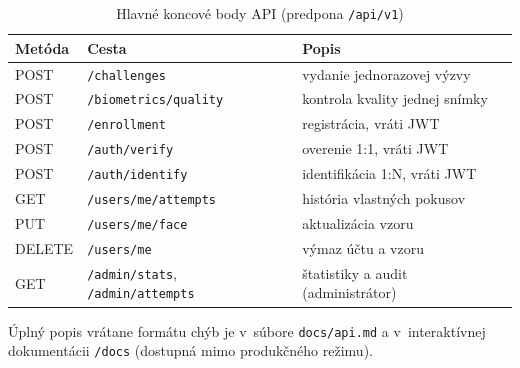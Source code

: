 \begin{table}[H]
  \centering
  \caption{Hlavné koncové body API (predpona \texttt{/api/v1})}
  \label{tab:api}
  \small
  \begin{tabularx}{\textwidth}{@{}l l X@{}}
    \toprule
    Metóda & Cesta & Popis \\
    \midrule
    POST & \texttt{/challenges} & vydanie jednorazovej výzvy \\
    POST & \texttt{/biometrics/quality} & kontrola kvality jednej snímky \\
    POST & \texttt{/enrollment} & registrácia, vráti JWT \\
    POST & \texttt{/auth/verify} & overenie 1:1, vráti JWT \\
    POST & \texttt{/auth/identify} & identifikácia 1:N, vráti JWT \\
    GET & \texttt{/users/me/attempts} & história vlastných pokusov \\
    PUT & \texttt{/users/me/face} & aktualizácia vzoru \\
    DELETE & \texttt{/users/me} & výmaz účtu a vzoru \\
    GET & \texttt{/admin/stats}, \texttt{/admin/attempts} & štatistiky a audit (administrátor) \\
    \bottomrule
  \end{tabularx}
\end{table}

Úplný popis vrátane formátu chýb je v~súbore \texttt{docs/api.md} a v~interaktívnej
dokumentácii \texttt{/docs} (dostupná mimo produkčného režimu).
